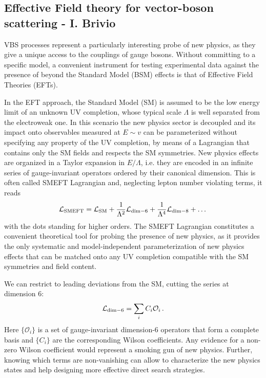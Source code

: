 \subsection{Effective Field theory for vector-boson scattering - I. Brivio}
VBS processes represent a particularly interesting probe of new physics, as they give a unique access to the couplings of gauge bosons.
Without committing to a specific model, a convenient instrument for testing experimental data against the presence of beyond the Standard Model (BSM) effects is that of Effective Field Theories (EFTs).

In the EFT approach, the Standard Model (SM) is assumed to be the low energy limit of an unknown UV completion, whose typical scale $\Lambda$ is well separated from the electroweak one. In this scenario the new physics sector is decoupled and its impact onto observables measured at $E\sim v$ can be parameterized without specifying any property of the UV completion, by means of a Lagrangian that contains only the SM fields and respects the SM symmetries. New physics effects are organized in a Taylor expansion in $E/\Lambda$, i.e. they are encoded in an infinite series of gauge-invariant operators ordered by their canonical dimension.
This is often called SMEFT Lagrangian and, neglecting lepton number violating terms, it reads
\begin{equation}
 \mathcal{L}_{\rm SMEFT} = \mathcal{L}_{\rm SM} + \frac{1}{\Lambda^2}\mathcal{L}_{\rm dim-6} + \frac{1}{\Lambda^4}\mathcal{L}_{\rm dim-8} + \dots
\end{equation} 
with the dots standing for higher orders.
The SMEFT Lagrangian constitutes a convenient theoretical tool for probing the presence of new physics, as it provides the only systematic and model-independent parameterization of new physics effects that can be matched onto any UV completion compatible with the SM symmetries and field content.

We can restrict to leading deviations from the SM, cutting the series at dimension 6:
\begin{equation}
 \mathcal{L}_{\rm dim-6} = \sum_i C_i \mathcal{O}_i\,.
\end{equation} 
Here $\{\mathcal{O}_i\}$ is a set of gauge-invariant dimension-6 operators that form a complete basis and $\{C_i\}$ are the corresponding Wilson coefficients.
%
Any evidence for a non-zero Wilson coefficient would represent a smoking gun of new physics. Further, knowing which terms are non-vanishing can allow to characterize the new physics states and help designing more effective direct search strategies.


